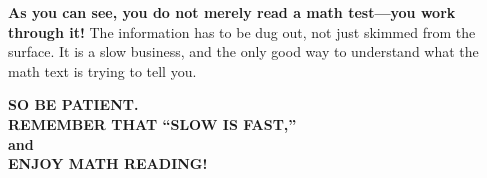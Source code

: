 \documentclass[../main.tex]{subfiles}
\begin{document}
\textbf{As you can see, you do not merely read a math test---you work through it!} The
information has to be dug out, not just skimmed from the surface. It is a slow business,
and the only good way to understand what the math text is trying to tell you.

\begin{center}
  \textbf{SO BE PATIENT.} \\
  \textbf{REMEMBER THAT ``SLOW IS FAST,''} \\
  \textbf{and} \\
  \textbf{ENJOY MATH READING!}
\end{center}
%
\end{document}
